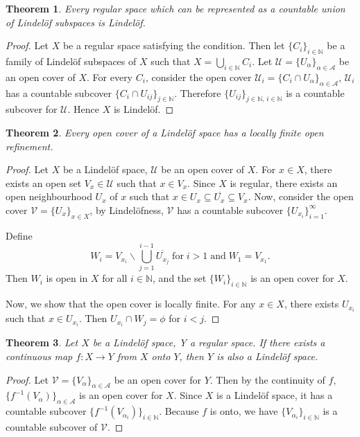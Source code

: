 \documentclass[12pt,oneside,english]{amsbook}
\numberwithin{equation}{section} %
\numberwithin{figure}{section} %
\theoremstyle{plain}
\numberwithin{section}{chapter}
\newtheorem{thm}{Theorem}[section]
\theoremstyle{plain}
\begin{document}
\begin{thm}\label{lindelof:thm:9}
  Every regular space which can be represented as a countable union of Lindel\"{o}f subspaces is Lindel\"{o}f.
\end{thm}
\begin{proof}
  Let $X$ be a regular space satisfying the condition. Then let $\{C_i\}_{i \in \mathbb{N}}$ be a family of Lindel\"{o}f subspaces of $X$ such that $X = \bigcup_{i \in \mathbb{N}}C_i$. Let $\mathcal{U} = \{U_{\alpha} \}_{\alpha \in \mathcal{A}}$ be an open cover of $X$. For every $C_i$, consider the open cover $\mathcal{U}_i = \{C_i \cap U_{\alpha}\}_{\alpha \in \mathcal{A}}$, $\mathcal{U}_i$ has a countable subcover $\{C_i \cap U_{ij}\}_{j \in \mathbb{N}}$. Therefore $\{U_{ij}\}_{j \in \mathbb{N}, \, i \in \mathbb{N}}$ is a countable subcover for $\mathcal{U}$. Hence $X$ is Lindel\"{o}f. 
\end{proof}

\begin{thm}\label{lindelof:thm:10}
  Every open cover of a Lindel\"{o}f space has a locally finite open refinement.
\end{thm}
\begin{proof}
  Let $X$ be a Lindel\"{o}f space, $\mathcal{U}$ be an open cover of $X$. For $x \in X$, there exists an open set $V_x \in \mathcal{U}$ such that $x \in V_x$. Since $X$ is regular, there exists an open neighbourhood $U_x$ of $x$ such that $x \in U_x \subseteq \overline{U_x} \subseteq V_x$. Now, consider the open cover $\mathcal{V} = \{U_x\}_{x \in X}$, by Lindel\"{o}fness, $\mathcal{V}$ has a countable subcover $\{U_{x_i}\}_{i = 1}^{\infty}$.

  Define $$W_i = V_{x_i} \backslash \bigcup_{j = 1}^{i - 1}\overline{U_{x_j}} \; \text{for} \; i > 1 \; \text{and} \; W_1 = V_{x_1}.$$ Then $W_i$ is open in $X$ for all $i \in \mathbb{N}$, and the set $\{W_i\}_{i \in \mathbb{N}}$ is an open cover for $X$.

  Now, we show that the open cover is locally finite. For any $x \in X$, there exists $U_{x_i}$ such that $x \in U_{x_i}$. Then $U_{x_i} \cap W_{j} = \phi$ for $i < j$. 
\end{proof}

\begin{thm}\label{lindelof:thm:11}
  Let $X$ be a Lindel\"{o}f space, Y a regular space. If there exists a continuous map $f: X \to Y$ from $X$ onto $Y$, then $Y$ is also a Lindel\"{o}f space.
\end{thm}
\begin{proof}
  Let $\mathcal{V} = \{V_{\alpha}\}_{\alpha \in \mathcal{A}}$ be an open cover for $Y$. Then by the continuity of $f$, $\{f^{-1}(V_{\alpha})\}_{\alpha \in \mathcal{A}}$ is an open cover for $X$. Since $X$ is a Lindel\"{o}f space, it has a countable subcover $\{f^{-1}(V_{\alpha_i})\}_{i \in \mathbb{N}}$. Because $f$ is onto, we have $\{V_{\alpha_i}\}_{i \in \mathbb{N}}$ is a countable subcover of $\mathcal{V}$. 
\end{proof}
\end{document}
